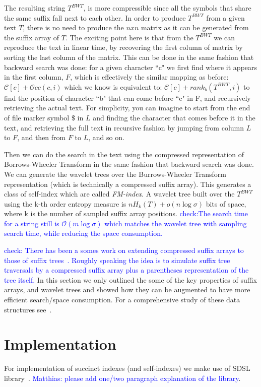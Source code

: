 \documentclass[11pt]{article}
\newcommand{\TODO}[1]{\textcolor{blue}{#1}}
\begin{document}
The resulting string $T^{BWT}$, is more compressible since all the symbols that share the same suffix fall next to each other. In order to produce $T^{BWT}$ from a given text $T$, there is no need to produce the $nxn$ matrix as it can be generated from the suffix array of $T$. The exciting point here is that from the $T^{BWT}$ we can reproduce the text in linear time, by recovering the first column of matrix by sorting the last column of the matrix. This can be done in the same fashion that backward search was done: for a given character ``c" we first find where it appears in the first column, $F$, which is effectively the similar mapping as before: $\mathcal{C}[c]+\mathcal{O}cc(c,i)$ which we know is equivalent to: $\mathcal{C}[c]+rank_b(T^{BWT},i)$ to find the position of character ``b" that can come before ``c" in F, and recursively retrieving the actual text. For simplicity, you can imagine to start from the end of file marker symbol $\$$ in $L$ and finding the character that comes before it in the text, and retrieving the full text in recursive fashion by jumping from column $L$ to $F$, and then from $F$ to $L$, and so on. 
  
Then we can do the search in the text using the compressed representation of Borrows-Wheeler Transform in the same fashion that backward search was done. We can generate the wavelet trees over the Burrows-Wheeler Transform representation (which is technically a compressed suffix array). This generates a class of self-index which are called \emph{FM-index}. A wavelet tree built over the $T^{BWT}$ using the k-th order entropy measure is $nH_k(T)+o(n\log \sigma)$ bits of space, where k is the number of sampled suffix array positions. \TODO{check:The search time for a string still is $\mathcal{O}(m\log\sigma)$ which matches the wavelet tree with sampling search time, while reducing the space consumption. }  

\TODO{check: There has been a somes work on extending compressed suffix arrays to those of suffix trees~\citep{}. Roughly speaking the idea is to simulate suffix tree traversals by a compressed suffix array plus a parentheses representation of the tree itself.} In this section we only outlined the some of the key properties of suffix arrays, and wavelet trees and showed how they can be augmented to have more efficient search/space consumption. For a comprehensive study of these data structures see~\citep{navarro2007compressed}.

\section{Implementation}
For implementation of succinct indexes (and self-indexes) we make use of SDSL library~\citep{gog2014theory}. \TODO{Matthias: please add one/two paragraph explanation of the library}.
\end{document}

